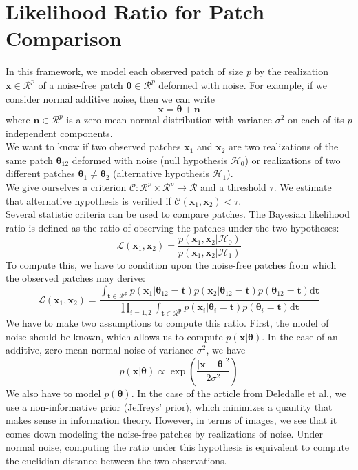 \documentclass[runningheads]{llncs}
\begin{document}
\section{Likelihood Ratio for Patch Comparison}

In this framework, we model each observed patch of size $p$ by the realization $\mathbf{x} \in \mathcal{R}^p$ of a noise-free patch $\boldsymbol{\theta} \in \mathcal{R}^p$ deformed with noise. For example, if we consider normal additive noise, then we can write
\[
\mathbf{x} = \boldsymbol{\theta} + \mathbf{n}
\]
where $\mathbf{n} \in \mathcal{R}^p$ is a zero-mean normal distribution with variance $\sigma^2$ on each of its $p$ independent components. \\
We want to know if two observed patches $\mathbf{x}_1$ and $\mathbf{x}_2$ are two realizations of the same patch $\boldsymbol{\theta}_{12}$ deformed with noise (null hypothesis $\mathcal{H}_0$) or realizations of two different patches $\boldsymbol{\theta}_1 \neq \boldsymbol{\theta}_2$ (alternative hypothesis $\mathcal{H}_1$). \\
We give ourselves a criterion $\mathcal{C} : \mathcal{R}^p \times \mathcal{R}^p \rightarrow \mathcal{R}$ and a threshold $\tau$. We estimate that alternative hypothesis is verified if $\mathcal{C}(\mathbf{x}_1,\mathbf{x}_2)<\tau$. \\
Several statistic criteria can be used to compare patches. The Bayesian likelihood ratio is defined as the ratio of observing the patches under the two hypotheses:
\[
\mathcal{L}(\mathbf{x}_1,\mathbf{x}_2)=\frac{p(\mathbf{x}_1,\mathbf{x}_2|\mathcal{H}_0)}{p(\mathbf{x}_1,\mathbf{x}_2|\mathcal{H}_1)}
\]
To compute this, we have to condition upon the noise-free patches from which the observed patches may derive:
\[
\mathcal{L}(\mathbf{x}_1,\mathbf{x}_2)=
\frac{\int_{\mathbf{t \in \mathcal{R}^p}} p(\mathbf{x}_1|\boldsymbol{\theta}_{12}=\mathbf{t}) p(\mathbf{x}_2|\boldsymbol{\theta}_{12}=\mathbf{t})p(\boldsymbol{\theta}_{12}=\mathbf{t})\mathrm{d}\mathbf{t}}{\prod_{i=1,2}\int_{\mathbf{t \in \mathcal{R}^p}} p(\mathbf{x}_i|\boldsymbol{\theta}_{i}=\mathbf{t}) p(\boldsymbol{\theta}_{i}=\mathbf{t})\mathrm{d}\mathbf{t}}
\]
We have to make two assumptions to compute this ratio. First, the model of noise should be known, which allows us to compute $p(\mathbf{x}|\boldsymbol\theta)$. In the case of an additive, zero-mean normal noise of variance $\sigma^2$, we have
\[
p(\mathbf{x}|\boldsymbol\theta)\propto\exp\left(\frac{|\mathbf{x}-\boldsymbol\theta|^2}{2\sigma^2}\right)
\]
We also have to model $p(\boldsymbol\theta)$. In the case of the article from Deledalle et al.\cite{Deledalle:2012}, we use a non-informative prior (Jeffreys' prior), which minimizes a quantity that makes sense in information theory. However, in terms of images, we see that it comes down modeling the noise-free patches by realizations of noise. Under normal noise, computing the ratio under this hypothesis is equivalent to compute the euclidian distance between the two observations.\\
\end{document}
